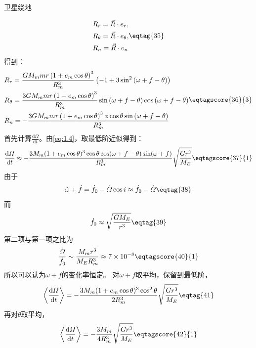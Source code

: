 \documentclass[answer]{cphos}
\begin{document}
\begin{problem}[50]{卫星绕地}
\begin{solution}
\begin{equation}
	\begin{aligned}
		&R_r=\vec{R}\cdot{e_r},\\
		&R_\theta=\vec{R}\cdot{e_{\theta}},\\
		&R_n=\vec{R}\cdot{e_n}
	\end{aligned} \eqtag{35}
\end{equation}
得到：
\begin{equation}
	\begin{aligned}
		&R_r=\frac{GM_{m}mr\left(1+e_m\cos\theta\right)^3}{R_m^3}\left(-1+3\sin^2\left(\omega+f-\theta\right)\right)\\
		&R_\theta=\frac{3GM_{m}mr\left(1+e_m\cos\theta\right)^3}{R_m^3}\sin\left(\omega+f-\theta\right)\cos\left(\omega+f-\theta\right)\\
		&R_n=-\frac{3GM_{m}mr\left(1+e_m\cos\theta\right)^3\phi\cos\theta\sin\left(\omega+f-\theta\right)}{R_m^3}
	\end{aligned} \eqtagscore{36}{3}
\end{equation}
首先计算$\frac{\mathrm{d}\varOmega}{\mathrm{d}t}$。由\ref{eq:1.4}，取最低阶近似得到：
\begin{equation}
	\frac{\mathrm{d}\varOmega}{\mathrm{d}t} \approx-\frac{3M_{m}(1+e_m\cos\theta)^3\cos\theta\cos(\omega+f-\theta)\sin(\omega+f)}{R_m^3}\sqrt{\frac{Gr^3}{M_{E}}} \eqtagscore{37}{1}
\end{equation}
由于
\begin{equation}
	\dot{\omega}+\dot{f}=\dot{f}_0-\dot{\varOmega}\cos i\approx\dot{f}_0-\dot{\varOmega} \eqtag{38}
\end{equation}
而
\begin{equation}
	\dot{f}_0\approx\sqrt{\frac{GM_E}{r^3}}\eqtag{39}
\end{equation}
第二项与第一项之比为
\begin{equation}
	\frac{\dot{\varOmega}}{\dot{f}_0}\sim\frac{M_{m}r^3}{M_{E}R_{m}^3}\approx7\times10^{-8} \eqtagscore{40}{1}
\end{equation}
所以可以认为$\omega+f$的变化率恒定。
对$\omega+f$取平均，保留到最低阶，
\begin{equation}
	\left\langle\frac{\mathrm{d}\varOmega}{\mathrm{d}t}\right\rangle=-\frac{3M_{m}(1+e_m\cos\theta)^3\cos^2\theta}{2R_m^3}\sqrt{\frac{Gr^3}{M_{E}}} \eqtag{41}
\end{equation}
再对$\theta$取平均，
\begin{equation}
	\left\langle\frac{\mathrm{d}\varOmega}{\mathrm{d}t}\right\rangle=-\frac{3M_{m}}{4R_m^3}\sqrt{\frac{Gr^3}{M_{E}}} \eqtagscore{42}{1}

\end{equation}
\end{solution}
\end{problem}
\end{document}
